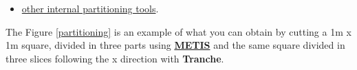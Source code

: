 \begin{itemize}









\item \href{\REFERENCEMANUAL\#partitionneurderiv}{other internal partitioning tools}.
\end{itemize}

\newpage
The Figure \ref{partitioning} is an example of what you can obtain by cutting a 1m x 1m square, divided in three parts using \href{http://glaros.dtc.umn.edu/gkhome/views/metis}{\textbf{METIS}} and the same square divided in three slices following the x direction with \textbf{Tranche}.

